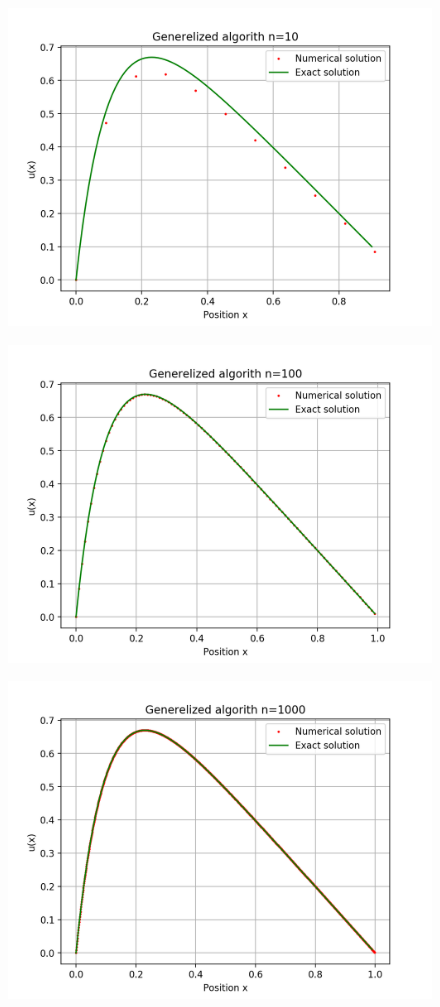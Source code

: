 \documentclass[10pt]{article}
\begin{document}
  \begin{figure}[h]
    \centering 
    \includegraphics[scale=0.7]{alg-0-n10plot.png}
  \end{figure}
  \begin{figure}
    \centering
    \includegraphics[scale=0.7]{alg-0-n100plot.png}
  \end{figure}
  \begin{figure}
    \centering
    \includegraphics[scale=0.7]{alg-0-n1000plot.png}
  \end{figure}
\end{document}

